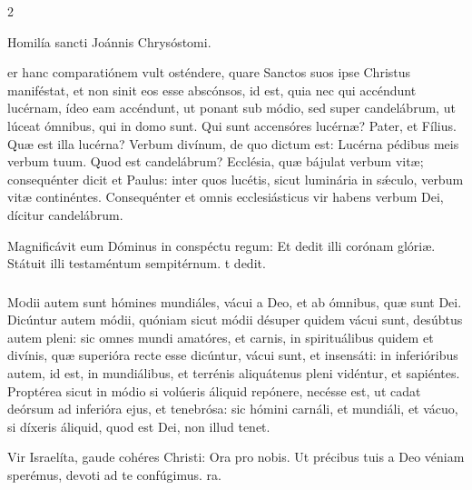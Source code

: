 \documentclass[9pt,twoside]{extarticle}
\begin{document}
\begin{multicols}{2}
\begin{center}Homilía sancti Joánnis Chrysóstomi.\\
\end{center}

er hanc comparatiónem vult osténdere, quare Sanctos suos ipse Christus maniféstat, et non sinit eos esse abscónsos, id est, quia nec qui accéndunt lucérnam, ídeo eam accéndunt, ut ponant sub módio, sed super candelábrum, ut lúceat ómnibus, qui in domo sunt. Qui sunt accensóres lucérnæ? Pater, et Fílius. Quæ est illa lucérna? Verbum divínum, de quo dictum est: Lucérna pédibus meis verbum tuum. Quod est candelábrum? Ecclésia, quæ bájulat verbum vitæ; consequénter dicit et Paulus: inter quos lucétis, sicut luminária in sǽculo, verbum vitæ continéntes. Consequénter et omnis ecclesiásticus vir habens verbum Dei, dícitur candelábrum.

\begin{tightlist}{}
\item {} Magnificávit eum Dóminus in conspéctu regum: \textred{*} Et dedit illi corónam glóriæ.  Státuit illi testaméntum sempitérnum. t dedit.
\end{tightlist}

\subsubsection*{\center{}}
\lettrine{M}odii autem sunt hómines mundiáles, vácui a Deo, et ab ómnibus, quæ sunt Dei. Dicúntur autem módii, quóniam sicut módii désuper quidem vácui sunt, desúbtus autem pleni: sic omnes mundi amatóres, et carnis, in spirituálibus quidem et divínis, quæ superióra recte esse dicúntur, vácui sunt, et insensáti: in inferióribus autem, id est, in mundiálibus, et terrénis aliquátenus pleni vidéntur, et sapiéntes. Proptérea sicut in módio si volúeris áliquid repónere, necésse est, ut cadat deórsum ad inferióra ejus, et tenebrósa: sic hómini carnáli, et mundiáli, et vácuo, si díxeris áliquid, quod est Dei, non illud tenet.

\begin{tightlist}{}
\item {} Vir Israelíta, gaude cohéres Christi: \textred{*} Ora pro nobis.  Ut précibus tuis a Deo véniam sperémus, devoti ad te confúgimus. ra.
\end{tightlist}


\end{multicols}
\end{document}
